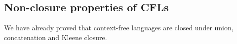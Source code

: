 

\setcounter{section}{7}
\setcounter{subsection}{3}
\setcounter{dfn}{6}

\subsection{Non-closure properties of CFLs}
We have already proved that context-free languages are closed under union, concatenation and Kleene closure.


